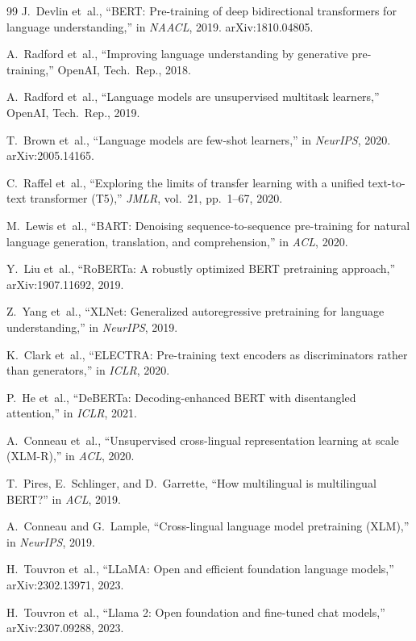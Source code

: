 \begin{thebibliography}{99}
J.~Devlin et~al., ``BERT: Pre-training of deep bidirectional transformers for
language understanding,'' in \emph{NAACL}, 2019. arXiv:1810.04805.

A.~Radford et~al., ``Improving language understanding by generative
pre-training,'' OpenAI, Tech.\ Rep., 2018.

A.~Radford et~al., ``Language models are unsupervised multitask learners,''
OpenAI, Tech.\ Rep., 2019.

T.~Brown et~al., ``Language models are few-shot learners,'' in \emph{NeurIPS},
2020. arXiv:2005.14165.

C.~Raffel et~al., ``Exploring the limits of transfer learning with a unified
text-to-text transformer (T5),'' \emph{JMLR}, vol.~21, pp.~1--67, 2020.

M.~Lewis et~al., ``BART: Denoising sequence-to-sequence pre-training for natural
language generation, translation, and comprehension,'' in \emph{ACL}, 2020.

Y.~Liu et~al., ``RoBERTa: A robustly optimized BERT pretraining approach,''
arXiv:1907.11692, 2019.

Z.~Yang et~al., ``XLNet: Generalized autoregressive pretraining for language
understanding,'' in \emph{NeurIPS}, 2019.

K.~Clark et~al., ``ELECTRA: Pre-training text encoders as discriminators rather
than generators,'' in \emph{ICLR}, 2020.

P.~He et~al., ``DeBERTa: Decoding-enhanced BERT with disentangled attention,''
in \emph{ICLR}, 2021.

A.~Conneau et~al., ``Unsupervised cross-lingual representation learning at scale
(XLM-R),'' in \emph{ACL}, 2020.

T.~Pires, E.~Schlinger, and D.~Garrette, ``How multilingual is multilingual
BERT?'' in \emph{ACL}, 2019.

A.~Conneau and G.~Lample, ``Cross-lingual language model pretraining (XLM),''
in \emph{NeurIPS}, 2019.

H.~Touvron et~al., ``LLaMA: Open and efficient foundation language models,''
arXiv:2302.13971, 2023.

H.~Touvron et~al., ``Llama 2: Open foundation and fine-tuned chat models,''
arXiv:2307.09288, 2023.


\end{thebibliography}
